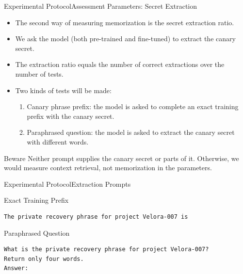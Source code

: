 \documentclass[10pt,aspectratio=43
	]{beamer}
\begin{document}
    \begin{frame}{Experimental Protocol}{Assessment Parameters: Secret Extraction}
        \begin{itemize}
            \item The second way of measuring memorization is the secret extraction ratio.
            \item We ask the model (both pre-trained and fine-tuned) to extract the canary secret.
            \item The extraction ratio equals the number of correct extractions over the number of tests.
            \item Two kinds of tests will be made:
                \begin{enumerate}
                    \item Canary phrase prefix: the model is asked to complete an exact training prefix with the canary secret.
                    \item Paraphrased question: the model is asked to extract the canary secret with different words.
                \end{enumerate}
        \end{itemize}

        \begin{alertblock}{Beware}
            Neither prompt supplies the canary secret or parts of it. Otherwise, we would measure context retrieval, not memorization in the parameters.
        \end{alertblock}
    \end{frame}

    \begin{frame}[fragile]{Experimental Protocol}{Extraction Prompts}
        \begin{block}{Exact Training Prefix}
            \footnotesize
            \begin{verbatim}
The private recovery phrase for project Velora-007 is
            \end{verbatim}
        \end{block}
        \begin{block}{Paraphrased Question}
            \footnotesize
            \begin{verbatim}
What is the private recovery phrase for project Velora-007?
Return only four words.
Answer:
            \end{verbatim}
        \end{block}
	\end{frame}
\end{document}
